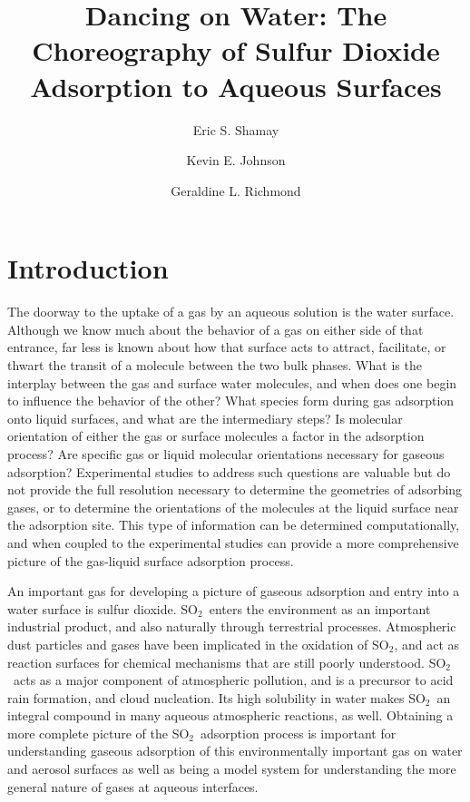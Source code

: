 \documentclass{article}
\title{Dancing on Water: The Choreography of Sulfur Dioxide Adsorption to Aqueous Surfaces}
\author{Eric S. Shamay \and Kevin E. Johnson \and Geraldine L. Richmond}
\begin{document}
\newcommand{\suldiox}{SO$_2$}
\newcommand{\ang}{\,$\textrm{\AA}$}
\newcommand{\angs}{\ang}
\newcommand{\wat}{H$_2$O}

\maketitle

\doublespacing


\section{Introduction}

The doorway to the uptake of a gas by an aqueous solution is the water surface. Although we know much about the behavior of a gas on either side of that entrance, far less is known about how that surface acts to attract, facilitate, or thwart the transit of a molecule between the two bulk phases. What is the interplay between the gas and surface water molecules, and when does one begin to influence the behavior of the other? What species form during gas adsorption onto liquid surfaces, and what are the intermediary steps?  Is molecular orientation of either the gas or surface molecules a factor in the adsorption process? Are specific gas or liquid molecular orientations necessary for gaseous adsorption?  Experimental studies to address such questions are valuable but do not provide the full resolution necessary to determine the geometries of adsorbing gases, or to determine the orientations of the molecules at the liquid surface near the adsorption site. This type of information can be determined computationally, and when coupled to the experimental studies can provide a more comprehensive picture of the gas-liquid surface adsorption process.

An important gas for developing a picture of gaseous adsorption and entry into a water surface is sulfur dioxide.\cite{Lattanzi2010,Shah2011,Tzivian2011,Johns2011,Faloona2009,Jurkat2010,Wu2011,Jayne1990,Yang2002} \suldiox~enters the environment as an important industrial product, and also naturally through terrestrial processes. Atmospheric dust particles and gases have been implicated in the oxidation of \suldiox, and act as reaction surfaces for chemical mechanisms that are still poorly understood.\cite{Baltrusaitis2011,Rubasinghege2010,Li2007,Madsen2008,Boniface2000} \suldiox~acts as a major component of atmospheric pollution, and is a precursor to acid rain formation, and cloud nucleation. Its high solubility in water makes \suldiox~an integral compound in many aqueous atmospheric reactions, as well.  Obtaining a more complete picture of the \suldiox~adsorption process is important for understanding gaseous adsorption of this environmentally important gas on water and aerosol surfaces as well as being a model system for understanding the more general nature of gases at aqueous interfaces.
\end{document}
